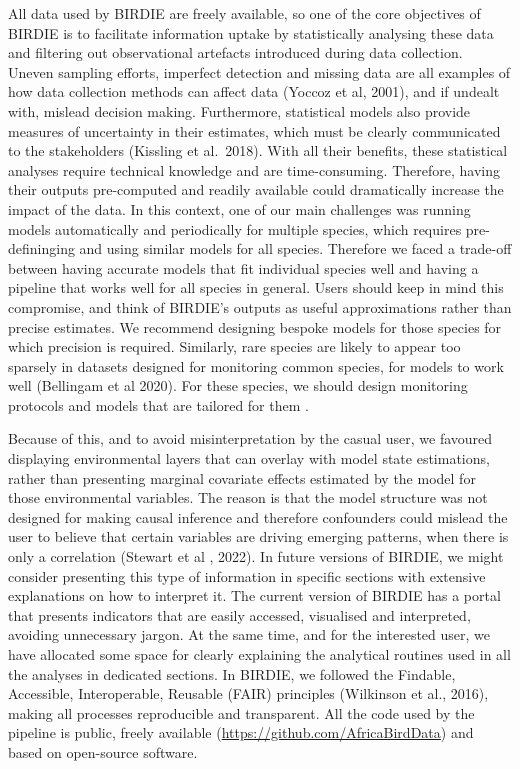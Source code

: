 \documentclass[utf8]{frontiersSCNS}
\begin{document}
All data used by BIRDIE are freely available, so one of the core
objectives of BIRDIE is to facilitate information uptake by
statistically analysing these data and filtering out observational
artefacts introduced during data collection. Uneven sampling efforts,
imperfect detection and missing data are all examples of how data
collection methods can affect data (Yoccoz et al, 2001), and if undealt
with, mislead decision making. Furthermore, statistical models also
provide measures of uncertainty in their estimates, which must be
clearly communicated to the stakeholders (Kissling et al.~2018). With
all their benefits, these statistical analyses require technical
knowledge and are time-consuming. Therefore, having their outputs
pre-computed and readily available could dramatically increase the
impact of the data. In this context, one of our main challenges was
running models automatically and periodically for multiple species,
which requires pre-defininging and using similar models for all species.
Therefore we faced a trade-off between having accurate models that fit
individual species well and having a pipeline that works well for all
species in general. Users should keep in mind this compromise, and think
of BIRDIE's outputs as useful approximations rather than precise
estimates. We recommend designing bespoke models for those species for
which precision is required. Similarly, rare species are likely to
appear too sparsely in datasets designed for monitoring common species,
for models to work well (Bellingam et al 2020). For these species, we
should design monitoring protocols and models that are tailored for them
.

Because of this, and to avoid misinterpretation by the casual user, we
favoured displaying environmental layers that can overlay with model
state estimations, rather than presenting marginal covariate effects
estimated by the model for those environmental variables. The reason is
that the model structure was not designed for making causal inference
and therefore confounders could mislead the user to believe that certain
variables are driving emerging patterns, when there is only a
correlation (Stewart et al , 2022). In future versions of BIRDIE, we
might consider presenting this type of information in specific sections
with extensive explanations on how to interpret it. The current version
of BIRDIE has a portal that presents indicators that are easily
accessed, visualised and interpreted, avoiding unnecessary jargon. At
the same time, and for the interested user, we have allocated some space
for clearly explaining the analytical routines used in all the analyses
in dedicated sections. In BIRDIE, we followed the Findable, Accessible,
Interoperable, Reusable (FAIR) principles (Wilkinson et al., 2016),
making all processes reproducible and transparent. All the code used by
the pipeline is public, freely available
(\url{https://github.com/AfricaBirdData}) and based on open-source
software.
\end{document}

